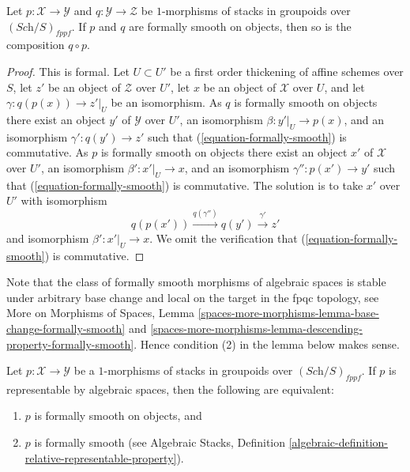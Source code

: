 \begin{lemma}
\label{lemma-composition-formally-smooth}
Let $p : \mathcal{X} \to \mathcal{Y}$ and $q : \mathcal{Y} \to \mathcal{Z}$
be $1$-morphisms of stacks in groupoids over $(\textit{Sch}/S)_{fppf}$.
If $p$ and $q$ are formally smooth on objects, then so is the composition
$q \circ p$.
\end{lemma}

\begin{proof}
This is formal. Let $U \subset U'$ be a first order thickening
of affine schemes over $S$, let $z'$ be an object of $\mathcal{Z}$
over $U'$, let $x$ be an object of $\mathcal{X}$ over $U$,
and let $\gamma : q(p(x)) \to z'|_U$ be an isomorphism. As $q$ is
formally smooth on objects there exist an object
$y'$ of $\mathcal{Y}$ over $U'$, an isomorphism
$\beta : y'|_U \to p(x)$, and an isomorphism $\gamma' : q(y') \to z'$
such that (\ref{equation-formally-smooth}) is commutative. As $p$ is
formally smooth on objects there exist an object
$x'$ of $\mathcal{X}$ over $U'$, an isomorphism
$\beta' : x'|_U \to x$, and an isomorphism $\gamma'' : p(x') \to y'$
such that (\ref{equation-formally-smooth}) is commutative.
The solution is to take $x'$ over $U'$ with isomorphism
$$
q(p(x')) \xrightarrow{q(\gamma'')} q(y') \xrightarrow{\gamma'} z'
$$
and isomorphism $\beta' : x'|_U \to x$. We omit the verification
that (\ref{equation-formally-smooth}) is commutative.
\end{proof}

\noindent
Note that the class of formally smooth morphisms of algebraic spaces is
stable under arbitrary base change and local on the target in the
fpqc topology, see
More on Morphisms of Spaces,
Lemma \ref{spaces-more-morphisms-lemma-base-change-formally-smooth} and
\ref{spaces-more-morphisms-lemma-descending-property-formally-smooth}.
Hence condition (2) in the lemma below makes sense.

\begin{lemma}
\label{lemma-representable-by-spaces-formally-smooth}
Let $p : \mathcal{X} \to \mathcal{Y}$ be a $1$-morphisms of stacks in groupoids
over $(\textit{Sch}/S)_{fppf}$. If $p$ is
representable by algebraic spaces, then the following are equivalent:
\begin{enumerate}
\item $p$ is formally smooth on objects, and
\item $p$ is formally smooth (see
Algebraic Stacks,
Definition \ref{algebraic-definition-relative-representable-property}).
\end{enumerate}
\end{lemma}


